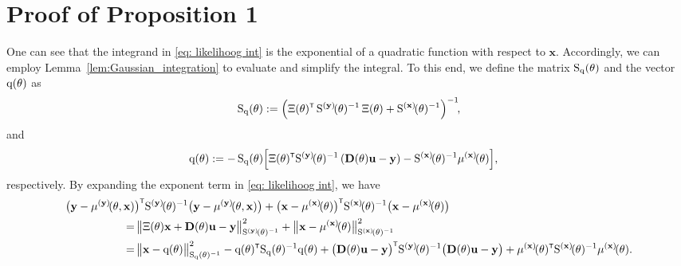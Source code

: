 \section{Proof of Proposition 1} \label{app:proof 1}
One can see that the integrand in \eqref{eq: likelihoog int} is the exponential of a quadratic function with respect to $\mathbf{x}$. 
Accordingly, we can employ Lemma~\ref{lem:Gaussian_integration} to evaluate and simplify the integral.
To this end, we define the matrix ${ \mathrm{S} }_{ \mathrm{q} }(\theta)$ and the vector ${ \mathrm{q} }({ \mathrm{\theta} })$ as
\begin{equation}\label{eqn:Sq}
    \Sqtheta 
    := 
    \Big(
    \Xi(\vctheta)^\tr\,
    \Sbfytheta^{-1}\, 
    \Xi(\vctheta)
    + 
    \Sbfxtheta^{-1}
    \Big)^{-1}\!,
\end{equation}
and 
\begin{equation}\label{eq:q function}
\begin{split}
    \vcq(\vctheta)
    &:= 
    -\,
    \Sqtheta
    \Big[
    \Xi(\vctheta)^\tr
    \Sbfytheta^{-1}\,
    ( \mathbf{D}(\vctheta)\mathbf{u}-\mathbf{y})
    -
    \Sbfxtheta^{-1}
    \mubfxtheta
    \Big],
\end{split}
\end{equation}
respectively.
By expanding the exponent term in \eqref{eq: likelihoog int}, we have
\begin{align}
    \big( \mathbf{y}-\mubfythetax & \big)^\tr
    \Sbfytheta^{-1}
    \big( \mathbf{y}-\mubfythetax \big) 
    + 
    \big( \mathbf{x}-\mubfxtheta \big)^\tr
    \Sbfxtheta^{-1} 
    \big( \mathbf{x}-\mubfxtheta \big)
    \nonumber\\
    =& \, 
    \big\| \Xi(\vctheta) \mathbf{x} + \mathbf{D}(\vctheta) \mathbf{u} -  \mathbf{y} \big\|^2_{\Sbfytheta^{-1}} 
    + 
    \big\| \mathbf{x} - \mubfxtheta \big\|^2_{\Sbfxtheta^{-1}} 
    \label{eq: S_q Gaussian}\\
    =& \, 
    \big\| \mathbf{x} - \vcq(\vctheta) \big\|^2_{\Sqtheta^{-1}} 
    - 
    \vcq(\vctheta)^\tr \Sqtheta^{-1} \vcq(\vctheta) 
    + 
    \big(\mathbf{D}(\vctheta)\mathbf{u} - \mathbf{y}\big)^\tr
    \Sbfytheta^{-1}
    \big(\mathbf{D}(\vctheta)\mathbf{u} - \mathbf{y}\big) 
    + 
    \mubfxtheta^\tr\Sbfxtheta^{-1}\mubfxtheta.
    \nonumber
\end{align}
